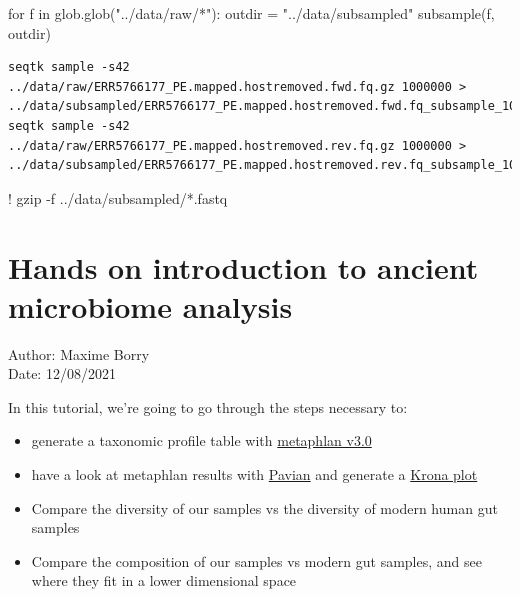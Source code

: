 \documentclass[
  letterpaper,
]{book}
\newenvironment{Shaded}{}{}
\newcommand{\ControlFlowTok}[1]{\textcolor[rgb]{0.84,0.23,0.29}{#1}}
\newcommand{\KeywordTok}[1]{\textcolor[rgb]{0.84,0.23,0.29}{#1}}
\newcommand{\NormalTok}[1]{\textcolor[rgb]{0.14,0.16,0.18}{#1}}
\newcommand{\OperatorTok}[1]{\textcolor[rgb]{0.14,0.16,0.18}{#1}}
\newcommand{\StringTok}[1]{\textcolor[rgb]{0.01,0.18,0.38}{#1}}
\providecommand{\tightlist}{%
  \setlength{\itemsep}{0pt}\setlength{\parskip}{0pt}}\usepackage{longtable,booktabs,array}
\begin{document}
\begin{Shaded}
\begin{Highlighting}[]
\ControlFlowTok{for}\NormalTok{ f }\KeywordTok{in}\NormalTok{ glob.glob(}\StringTok{"../data/raw/*"}\NormalTok{):}
\NormalTok{    outdir }\OperatorTok{=} \StringTok{"../data/subsampled"}
\NormalTok{    subsample(f, outdir)}
\end{Highlighting}
\end{Shaded}

\begin{verbatim}
seqtk sample -s42 ../data/raw/ERR5766177_PE.mapped.hostremoved.fwd.fq.gz 1000000 >
../data/subsampled/ERR5766177_PE.mapped.hostremoved.fwd.fq_subsample_1000000.fastq
seqtk sample -s42 ../data/raw/ERR5766177_PE.mapped.hostremoved.rev.fq.gz 1000000 >
../data/subsampled/ERR5766177_PE.mapped.hostremoved.rev.fq_subsample_1000000.fastq
\end{verbatim}

\begin{Shaded}
\begin{Highlighting}[]
\OperatorTok{!}\NormalTok{ gzip }\OperatorTok{{-}}\NormalTok{f ..}\OperatorTok{/}\NormalTok{data}\OperatorTok{/}\NormalTok{subsampled}\OperatorTok{/*}\NormalTok{.fastq}
\end{Highlighting}
\end{Shaded}

\hypertarget{hands-on-introduction-to-ancient-microbiome-analysis}{%
\section{Hands on introduction to ancient microbiome
analysis}\label{hands-on-introduction-to-ancient-microbiome-analysis}}

Author: Maxime Borry\\
Date: 12/08/2021

In this tutorial, we're going to go through the steps necessary to:

\begin{itemize}
\tightlist
\item
  generate a taxonomic profile table with
  \href{https://github.com/biobakery/MetaPhlAn}{metaphlan v3.0}
\item
  have a look at metaphlan results with
  \href{https://github.com/fbreitwieser/pavian}{Pavian} and generate a
  \href{https://github.com/marbl/Krona/wiki}{Krona plot}
\item
  Compare the diversity of our samples vs the diversity of modern human
  gut samples
\item
  Compare the composition of our samples vs modern gut samples, and see
  where they fit in a lower dimensional space
\end{itemize}
\end{document}
